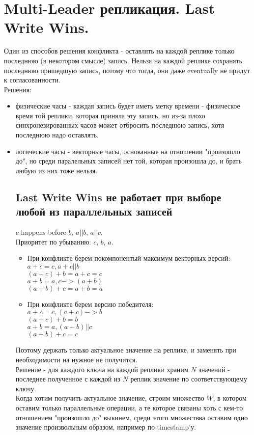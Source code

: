 \section{Multi-Leader репликация. Last Write Wins.}
    Один из способов решения конфликта - оставлять на каждой реплике только последнюю (в некотором смысле) запись. Нельзя на каждой реплике сохранять последнюю пришедшую запись, потому что тогда, они даже eventually не придут к согласованности. \\
    Решения:
    \begin{itemize}
        \item физические часы - каждая запись будет иметь метку времени - физическое время той реплики, которая приняла эту запись, но из-за плохо синхронезированных часов может отбросить последнюю запись, хотя последнюю надо оставлять.
        \item логические часы - векторные часы, основанные на отношении "произошло до", но среди паралельных записей нет той, которая произошла до, и брать любую из них тоже нельзя.
        \subsection{Last Write Wins не работает при выборе любой из параллельных записей}
          $c$ happens-before $b$, $a || b$, $a || c$. \\
          Приоритет по убыванию: $c$, $b$, $a$. \\
          \begin{itemize}
          \item При конфликте берем покомпонентый максимум векторных версий: \\
          $a + c = c, a + c || b$\\
          $(a + c) + b = a + c = c$\\
          $a + b = a, c -> (a + b)$\\
          $(a + b) + c = a + b = a$
          \item При конфликте берем версию победителя: \\
          $a + c = c, (a + c) -> b$ \\
          $(a + c) + b = b$ \\
          $a + b = a, (a + b) || c$\\
          $(a + b) + c = c$
          \end{itemize}
        Поэтому держать только актуальное значение на реплике, и заменять при необходимости на нужное не получится. \\
        Решение - для каждого ключа на каждой реплики храним $N$ значений - последнее полученное с каждой из $N$ реплик значение по соответствующему ключу. \\
        Когда хотим получить актуальное значение, строим множество $W$, в котором оставим только параллельные операции, а те которое связаны хоть с кем-то отношением "произошло до" выкинем, среди этого множествва оставим одно значение произвольным образом, например по timestamp'у.    
    \end{itemize}
